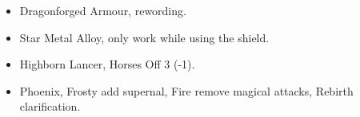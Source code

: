 %

\subtitle{Army Model Rules}

\begin{itemize}
\item Dragonforged Armour, rewording.
\end{itemize}

%
%

\subtitle{Special Equipment}

\begin{itemize}
\item Star Metal Alloy, only work while using the shield.
\end{itemize}

%

\subtitle{Core}

\begin{itemize}
\item Highborn Lancer, Horses Off 3 (-1).
\end{itemize}

%

%

%

\subtitle{Ancient Allies}

\begin{itemize}
\item Phoenix, Frosty add supernal, Fire remove magical attacks, Rebirth clarification.
\end{itemize}

